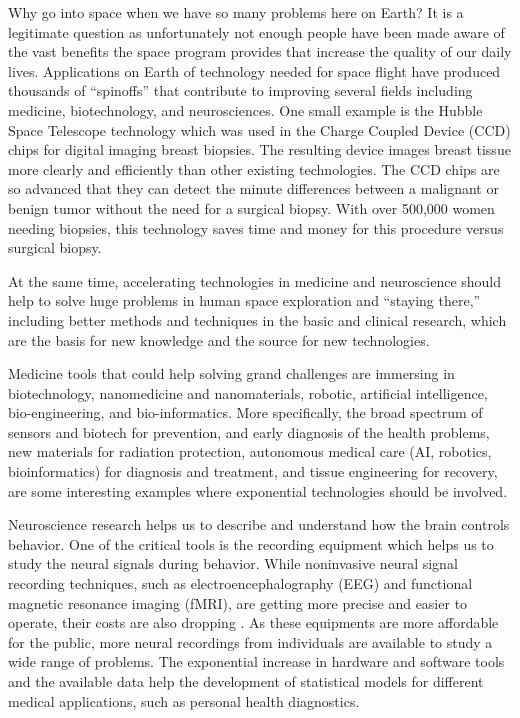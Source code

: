\documentclass[letter,11pt]{article}
\begin{document}
Why go into space when we have so many problems here on Earth? It is a
legitimate question as unfortunately not enough people have been made aware of
the vast benefits the space program provides that increase the quality of our
daily lives. Applications on Earth of technology needed for space flight have
produced thousands of ``spinoffs'' that contribute to improving several fields
including medicine, biotechnology, and neurosciences\cite{TheSpacePlace2004}.
One small example is the Hubble Space Telescope technology which was used in
the Charge Coupled Device (CCD) chips for digital imaging breast biopsies. The
resulting device images breast tissue more clearly and efficiently than other
existing technologies. The CCD chips are so advanced that they can detect the
minute differences between a malignant or benign tumor without the need for a
surgical biopsy. With over 500,000 women needing biopsies, this technology saves
time and money for this procedure versus surgical biopsy. 
 
At the same time, accelerating technologies in medicine and neuroscience should
help to solve huge problems in human space exploration and ``staying there,''
including better methods and techniques in the basic and clinical research,
which are the basis for new knowledge and the source for new technologies. 
 
Medicine tools that could help solving grand challenges are immersing in
biotechnology, nanomedicine and nanomaterials, robotic, artificial
intelligence, bio-engineering, and bio-informatics. More specifically, the
broad spectrum of sensors and biotech for prevention, and early diagnosis of
the health problems, new materials for radiation protection, autonomous medical
care (AI, robotics, bioinformatics) for diagnosis and treatment, and tissue
engineering for recovery, are some interesting examples where exponential
technologies should be involved.
 
Neuroscience research helps us to describe and understand how the brain
controls behavior. One of the critical tools is the recording equipment which
helps us to study the neural signals during behavior. While noninvasive neural
signal recording techniques, such as electroencephalography (EEG) and
functional magnetic resonance imaging (fMRI), are getting more precise and
easier to operate, their costs are also dropping \cite{mri1991}. As these
equipments are more affordable for the public, more neural recordings from
individuals are available to study a wide range of problems. The exponential
increase in hardware and software tools and the available data help the
development of statistical models for different medical applications, such as
personal health diagnostics.
 
\end{document}
